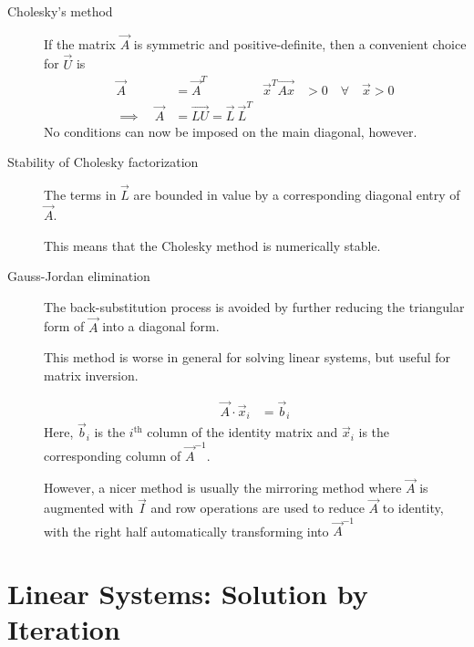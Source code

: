 \begin{description}
    \item[Cholesky's method] If the matrix $ \vec{A} $ is symmetric and
        positive-definite, then a convenient choice for $ \vec{U} $ is
        \begin{align}
            \vec{A}                & = \vec{A}^T                        &
            \vec{x}^T \vec{Ax}     & > 0 \quad \forall\quad \vec{x} > 0   \\
            \implies \quad \vec{A} & = \vec{LU} = \vec{L}\ \vec{L}^T
        \end{align}
        No conditions can now be imposed on the main diagonal, however.

    \item[Stability of Cholesky factorization] The terms in $ \vec{L} $ are bounded
        in value by a corresponding diagonal entry of $ \vec{A} $. \par
        This means that the Cholesky method is numerically stable.

    \item[Gauss-Jordan elimination] The back-substitution process is avoided by further
        reducing the triangular form of $ \vec{A} $ into a diagonal form. \par
        This method is worse in general for solving linear systems, but useful for
        matrix inversion. \par
        \begin{align}
            \vec{A} \cdot \vec{x}_i & = \vec{b}_i
        \end{align}
        Here, $ \vec{b}_i $ is the $ i^{\text{th}} $ column of the identity matrix and
        $ \vec{x}_i $ is the corresponding column of $ \vec{A}^{-1} $. \par
        However, a nicer method is usually the mirroring method where $ \vec{A} $ is
        augmented with $ \vec{I} $ and row operations are used to reduce $ \vec{A} $ to
        identity, with the right half automatically transforming into $ \vec{A}^{-1} $
\end{description}

\section{Linear Systems: Solution by Iteration}

